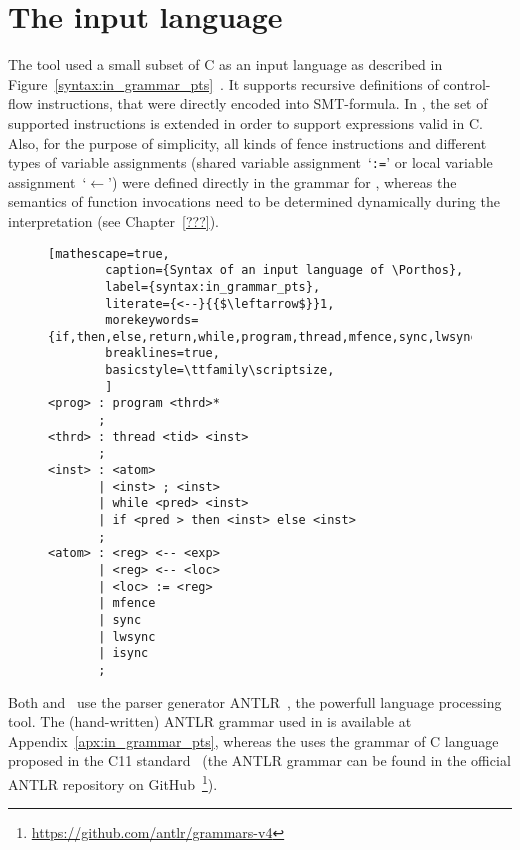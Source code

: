 \chapter{The input language}
\label{ch:impl}


The \Porthos tool used a small subset of C as an input language as described in Figure~\ref{syntax:in_grammar_pts}~\cite{Porthos17}.
It supports recursive definitions of control-flow instructions, that were directly encoded into SMT-formula.
In \mousquetaires, the set of supported instructions is extended in order to support expressions valid in C. %
Also, for the purpose of simplicity, all kinds of fence instructions and different types of variable assignments (shared variable assignment~`\texttt{:=}' or local variable assignment~`$\mathtt{\leftarrow}$') were defined directly in the grammar for \Porthos, whereas the semantics of function invocations need to be determined dynamically during the interpretation
(see Chapter~\ref{???}).


\begin{figure}%
\begin{lstlisting}[mathescape=true,
        caption={Syntax of an input language of \Porthos},
        label={syntax:in_grammar_pts},
        literate={<--}{{$\leftarrow$}}1,
        morekeywords={if,then,else,return,while,program,thread,mfence,sync,lwsync,isync}
        breaklines=true,
        basicstyle=\ttfamily\scriptsize,
        ]
<prog> : program <thrd>*
       ;
<thrd> : thread <tid> <inst>
       ;
<inst> : <atom> 
       | <inst> ; <inst>
       | while <pred> <inst>
       | if <pred > then <inst> else <inst>
       ;
<atom> : <reg> <-- <exp> 
       | <reg> <-- <loc>
       | <loc> := <reg> 
       | mfence
       | sync
       | lwsync
       | isync
       ;
\end{lstlisting}
\end{figure}


Both \Porthos and \mousquetaires \ use the parser generator ANTLR~\cite{parr2013definitive}, the powerfull language processing tool. The (hand-written) ANTLR grammar used in \Porthos is available at Appendix~\ref{apx:in_grammar_pts}, whereas the \mousquetaires uses the grammar of C language proposed in the C11 standard~\cite{jtc2011sc22} (the ANTLR grammar can be found in the official ANTLR repository on GitHub~\footnote{\url{https://github.com/antlr/grammars-v4}}).
